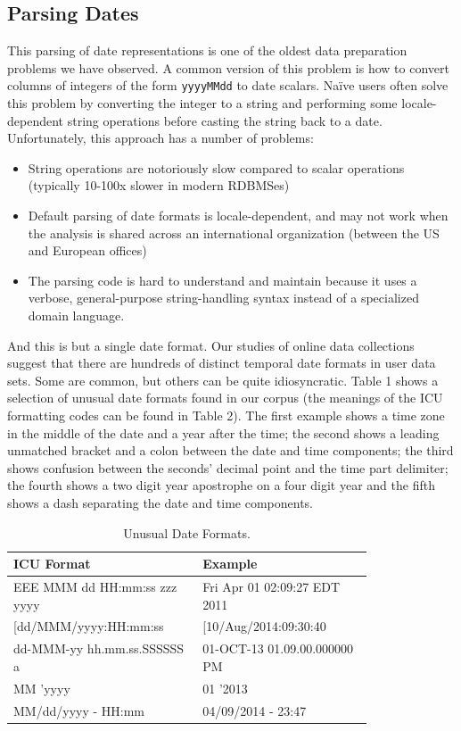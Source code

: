 \subsection{Parsing Dates}
This parsing of date representations is one of the oldest data preparation problems we have observed. A common version of this problem is how to convert columns of integers of the form \texttt{yyyyMMdd} to date scalars. Na\"{i}ve users often solve this problem by converting the integer to a string and performing some locale-dependent string operations before casting the string back to a date. Unfortunately, this approach has a number of problems:
\begin{itemize}
\item String operations are notoriously slow compared to scalar operations (typically 10-100x slower in modern RDBMSes)
\item Default parsing of date formats is locale-dependent, and may not work when the analysis is shared across an international organization (\eg between the US and European offices)
\item The parsing code is hard to understand and maintain because it uses a verbose, general-purpose string-handling syntax instead of a specialized domain language.
\end{itemize}

And this is but a single date format. Our studies of online data collections suggest that there are hundreds of distinct temporal date formats in user data sets. Some are common, but others can be quite idiosyncratic. Table 1 shows a selection of unusual date formats found in our corpus (the meanings of the ICU formatting codes can be found in Table 2). The first example shows a time zone in the middle of the date and a year after the time; the second shows a leading unmatched bracket and a colon between the date and time components; the third shows confusion between the seconds' decimal point and the time part delimiter; the fourth shows a two digit year apostrophe on a four digit year and the fifth shows a dash separating the date and time components.

\begin{table}[ht]
\centering
\begin{tabular}{|p{0.4\linewidth}| p{0.4\linewidth}|}
\hline
\centering
\textbf{ICU Format} & \textbf{Example}\\ \hline
\scriptsize{EEE MMM dd HH:mm:ss zzz yyyy} & \scriptsize{Fri Apr 01 02:09:27 EDT 2011}\\ \hline
\scriptsize{[dd/MMM/yyyy:HH:mm:ss} & \scriptsize{[10/Aug/2014:09:30:40}\\ \hline
\scriptsize{dd-MMM-yy hh.mm.ss.SSSSSS a} & \scriptsize{01-OCT-13 01.09.00.000000 PM}\\ \hline
\scriptsize{MM 'yyyy} & \scriptsize{01 '2013}\\ \hline
\scriptsize{MM/dd/yyyy - HH:mm} & \scriptsize{04/09/2014 - 23:47}\\ \hline
\end{tabular}
\label{tab:dateformats}
\caption{Unusual Date Formats.}
\end{table}

